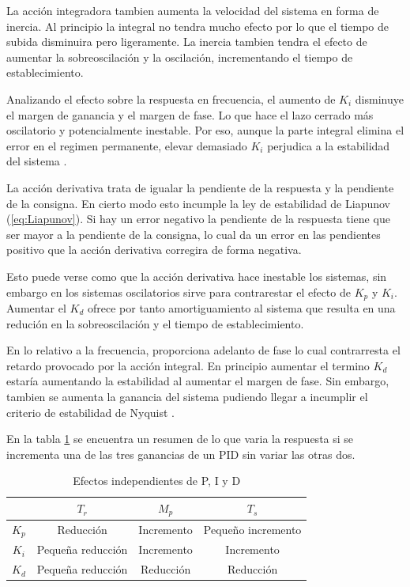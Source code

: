 \documentclass{book}
\begin{document}
La acci\'on integradora tambien aumenta la velocidad del sistema en forma de inercia. Al principio la integral no tendra mucho efecto por lo que el tiempo de subida disminuira pero ligeramente. La inercia tambien tendra el efecto de aumentar la sobreoscilaci\'on y la oscilaci\'on, incrementando el tiempo de establecimiento. \par

Analizando el efecto sobre la respuesta en frecuencia, el aumento de $K_i$ disminuye el margen de ganancia y el margen de fase. Lo que hace el lazo cerrado m\'as oscilatorio y potencialmente inestable. Por eso, aunque la parte integral elimina el error en el regimen permanente, elevar demasiado $K_i$ perjudica a la estabilidad del sistema \cite{PIDtunning}.  \par

La acci\'on derivativa trata de igualar la pendiente de la respuesta y la pendiente de la consigna. En cierto modo esto incumple la ley de estabilidad de Liapunov (\ref{eq:Liapunov}). Si hay un error negativo la pendiente de la respuesta tiene que ser mayor a la pendiente de la consigna, lo cual da un error en las pendientes positivo que la acci\'on derivativa corregira de forma negativa. \par 

Esto puede verse como que la acci\'on derivativa hace inestable los sistemas, sin embargo en los sistemas oscilatorios sirve para contrarestar el efecto de $K_p$ y $K_i$. Aumentar el $K_d$ ofrece por tanto amortiguamiento al sistema que resulta en una reduci\'on en la sobreoscilaci\'on y el tiempo de establecimiento.\par

En lo relativo a la frecuencia, proporciona adelanto de fase lo cual contrarresta el retardo provocado por la acci\'on integral. En principio aumentar el termino $K_d$ estar\'ia aumentando la estabilidad al aumentar el margen de fase. Sin embargo, tambien se aumenta la ganancia del sistema pudiendo llegar a incumplir el criterio de estabilidad de Nyquist \cite{PIDtunning}.\par

En la tabla \ref{ta:tuning} se encuentra un resumen de lo que varia la respuesta si se incrementa una de las tres ganancias de un PID sin variar las otras dos. \par

\begin{table}[h!]
\centering
\caption{Efectos independientes de P, I y D \cite{PIDtunning}}
\label{ta:tuning}
\begin{tabular}{c|ccc}
	 & $T_r$    & $M_p$ & $T_s$ \\ \hline
$K_p$         & Reducci\'on   & Incremento     & Pequeño incremento          \\
$K_i$        & Pequeña reducci\'on & Incremento       & Incremento          \\
$K_d$        & Pequeña reducci\'on & Reducci\'on     & Reducci\'on      
\end{tabular}
\end{table}
\end{document}
